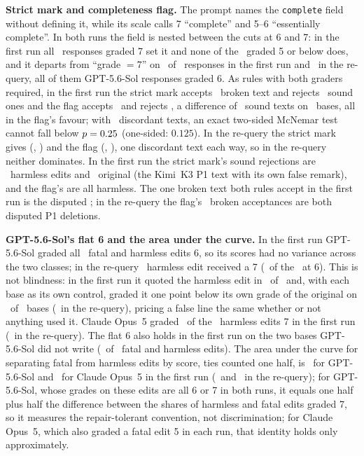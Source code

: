 \textbf{Strict mark and completeness flag.} The prompt names the \texttt{complete} field without defining it, while its scale calls 7 ``complete'' and 5--6 ``essentially complete''. In both runs the field is nested between the cuts at 6 and 7: in the first run all \CRGradeSevenP\ responses graded 7 set it and none of the \CRGradeLowP\ graded 5 or below does, and it departs from ``grade $=7$'' on \CRFlagDepartP\ of \CRNResponses\ responses in the first run and \CRFlagDepartR\ in the re-query, all of them GPT-5.6-Sol responses graded 6. As rules with both graders required, in the first run the strict mark accepts \CRStrictBrokenAccP\ broken text and rejects \CRStrictSoundRejP\ sound ones and the flag accepts \CRFlagBrokenAccP\ and rejects \CRFlagSoundRejP, a difference of \CRStrictFlagDiscordSoundP\ sound texts on \CRStrictFlagDiscordBasesP\ bases, all in the flag's favour; with \CRStrictFlagDiscordSoundP\ discordant texts, an exact two-sided McNemar test cannot fall below $p = 0.25$ (one-sided: $0.125$). In the re-query the strict mark gives (\CRStrictBrokenAccR, \CRStrictSoundRejR) and the flag (\CRFlagBrokenAccR, \CRFlagSoundRejR), one discordant text each way, so in the re-query neither dominates. In the first run the strict mark's sound rejections are \CRStrictSoundRejHP\ harmless edits and \CRStrictSoundRejOP\ original (the Kimi~K3 P1 text with its own false remark), and the flag's are all harmless. The one broken text both rules accept in the first run is the disputed \CRIdGptPoneG; in the re-query the flag's \CRFlagBrokenAccR\ broken acceptances are both disputed P1 deletions.

\textbf{GPT-5.6-Sol's flat 6 and the area under the curve.} In the first run GPT-5.6-Sol graded all \CRGPTFlatSixP\ fatal and harmless edits 6, so its scores had no variance across the two classes; in the re-query \CRGPTHSevenR\ harmless edit received a 7 (\CRGPTFlatSixR\ of the \CRNChecks\ at 6). This is not blindness: in the first run it quoted the harmless edit in \CRGPTHQuoteP\ of \CRNPerClass\ and, with each base as its own control, graded it one point below its own grade of the original on \CRGPTHBelowOrigP\ of \CRNPerClass\ bases (\CRGPTHBelowOrigR\ in the re-query), pricing a false line the same whether or not anything used it. Claude Opus~5 graded \CRClaudeHSevenP\ of the \CRNPerClass\ harmless edits 7 in the first run (\CRClaudeHSevenR\ in the re-query). The flat 6 also holds in the first run on the two bases GPT-5.6-Sol did not write (\CRGPTNonGptFlatP\ of \CRNNonGptFH\ fatal and harmless edits). The area under the curve for separating fatal from harmless edits by score, ties counted one half, is \CRAUCGPTP\ for GPT-5.6-Sol and \CRAUCClaudeP\ for Claude Opus~5 in the first run (\CRAUCGPTR\ and \CRAUCClaudeR\ in the re-query); for GPT-5.6-Sol, whose grades on these edits are all 6 or 7 in both runs, it equals one half plus half the difference between the shares of harmless and fatal edits graded 7, so it measures the repair-tolerant convention, not discrimination; for Claude Opus~5, which also graded a fatal edit 5 in each run, that identity holds only approximately.

